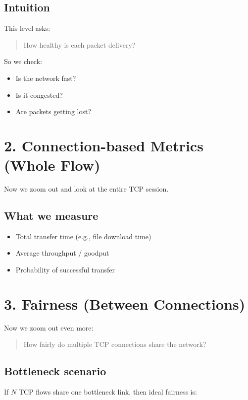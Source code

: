 \subsection*{Intuition}

This level asks:

\begin{quote}
How healthy is each packet delivery?
\end{quote}

So we check:
\begin{itemize}
    \item Is the network fast?
    \item Is it congested?
    \item Are packets getting lost?
\end{itemize}

\section{2. Connection-based Metrics (Whole Flow)}

Now we zoom out and look at the entire TCP session.

\subsection*{What we measure}
\begin{itemize}
    \item Total transfer time (e.g., file download time)
    \item Average throughput / goodput
    \item Probability of successful transfer
\end{itemize}

\section{3. Fairness (Between Connections)}

Now we zoom out even more:

\begin{quote}
How fairly do multiple TCP connections share the network?
\end{quote}

\subsection*{Bottleneck scenario}

If $N$ TCP flows share one bottleneck link, then ideal fairness is:


